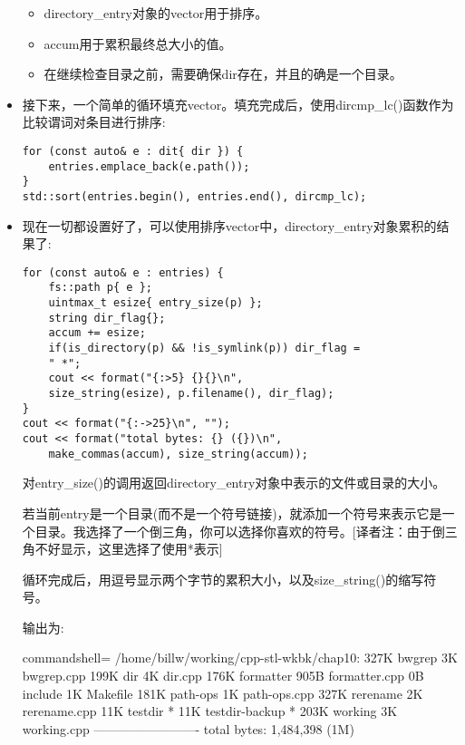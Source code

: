 \begin{itemize}
\begin{itemize}
\item 
directory\_entry对象的vector用于排序。

\item 
accum用于累积最终总大小的值。

\item 
在继续检查目录之前，需要确保dir存在，并且的确是一个目录。
\end{itemize}

\item 
接下来，一个简单的循环填充vector。填充完成后，使用dircmp\_lc()函数作为比较谓词对条目进行排序:

\begin{lstlisting}[style=styleCXX]
for (const auto& e : dit{ dir }) {
	entries.emplace_back(e.path());
}
std::sort(entries.begin(), entries.end(), dircmp_lc);
\end{lstlisting}

\item 
现在一切都设置好了，可以使用排序vector中，directory\_entry对象累积的结果了:

\begin{lstlisting}[style=styleCXX]
for (const auto& e : entries) {
	fs::path p{ e };
	uintmax_t esize{ entry_size(p) };
	string dir_flag{};
	accum += esize;
	if(is_directory(p) && !is_symlink(p)) dir_flag =
	" *";
	cout << format("{:>5} {}{}\n",
	size_string(esize), p.filename(), dir_flag);
}
cout << format("{:->25}\n", "");
cout << format("total bytes: {} ({})\n",
	make_commas(accum), size_string(accum));
\end{lstlisting}

对entry\_size()的调用返回directory\_entry对象中表示的文件或目录的大小。

若当前entry是一个目录(而不是一个符号链接)，就添加一个符号来表示它是一个目录。我选择了一个倒三角，你可以选择你喜欢的符号。[译者注：由于倒三角不好显示，这里选择了使用*表示]

循环完成后，用逗号显示两个字节的累积大小，以及size\_string()的缩写符号。

输出为:

\begin{tcblisting}{commandshell={}}
/home/billw/working/cpp-stl-wkbk/chap10:
327K bwgrep
  3K bwgrep.cpp
199K dir
  4K dir.cpp
176K formatter
905B formatter.cpp
  0B include
  1K Makefile
181K path-ops
  1K path-ops.cpp
327K rerename
  2K rerename.cpp
 11K testdir *
 11K testdir-backup *
203K working
  3K working.cpp
-------------------------
total bytes: 1,484,398 (1M)
\end{tcblisting}

\end{itemize}

